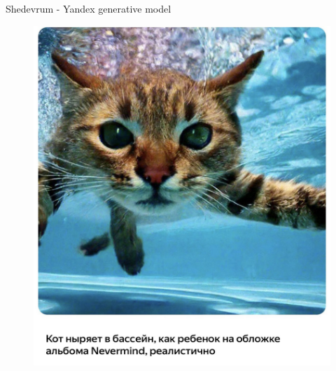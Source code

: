 \begin{frame}{Shedevrum - Yandex generative model}
	
		\begin{minipage}[t]{0.5\columnwidth}
			\begin{figure}
				\includegraphics[width=\linewidth]{figs/shedevrum1}
			\end{figure}
		\end{minipage}%
		\begin{minipage}[t]{0.5\columnwidth}
			\begin{figure}

\end{figure}
\end{minipage}
\end{frame}
